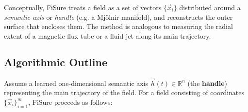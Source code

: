 \documentclass{article}
\begin{document}
Conceptually, FiSure treats a field as a set of vectors 
\(\{\vec{x}_i\}\) distributed around a \textit{semantic axis} or 
\textit{handle} (e.g. a Mjölnir manifold), and reconstructs the 
outer surface that encloses them.  
The method is analogous to measuring the radial extent of a 
magnetic flux tube or a fluid jet along its main trajectory.

\subsection{Algorithmic Outline}

Assume a learned one-dimensional semantic axis 
\(\vec{h}(t) \in \mathbb{R}^n\) (the \textbf{handle}) representing 
the main trajectory of the field.  
For a field consisting of coordinates 
\(\{\vec{x}_i\}_{i=1}^{m}\), FiSure proceeds as follows:
\end{document}
